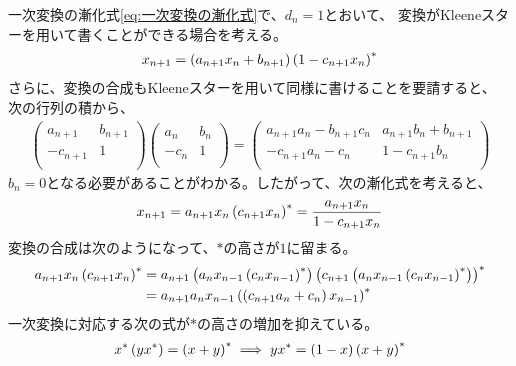 {	一次変換の漸化式\eqref{eq:一次変換の漸化式}で、$d_n=1$とおいて、
	変換がKleeneスターを用いて書くことができる場合を考える。
	\begin{equation*}\begin{split}
		x_{n+1} = \mathinner{\left({a_{n+1}x_n + b_{n+1}}\right)}\mathinner{\left({1 - c_{n+1}x_n}\right)}^*
	\end{split}\end{equation*}
	さらに、変換の合成もKleeneスターを用いて同様に書けることを要請すると、
	次の行列の積から、
	\begin{equation*}\begin{split}
		\begin{pmatrix}
			a_{n+1} & b_{n+1} \\ -c_{n+1} & 1 \\
		\end{pmatrix}\begin{pmatrix}
			a_n & b_n \\ -c_n & 1 \\
		\end{pmatrix} = \begin{pmatrix}
			a_{n+1}a_n - b_{n+1}c_n & a_{n+1}b_n + b_{n+1} \\ 
			-c_{n+1}a_n - c_n & 1 - c_{n+1}b_n \\
		\end{pmatrix}
	\end{split}\end{equation*}
	$b_n=0$となる必要があることがわかる。したがって、次の漸化式を考えると、
	\begin{equation*}\begin{split}
		x_{n+1} = a_{n+1}x_n\mathinner{\left({c_{n+1}x_n}\right)}^*
		= \frac{a_{n+1}x_n}{1 - c_{n+1}x_n}
	\end{split}\end{equation*}
	変換の合成は次のようになって、$*$の高さが$1$に留まる。
	\begin{equation*}\begin{split}
		a_{n+1}x_n\mathinner{\left({c_{n+1}x_n}\right)}^* 
		&= a_{n+1}\mathinner{\left({a_nx_{n-1}\mathinner{\left({c_nx_{n-1}}\right)}^*}\right)}
			\mathinner{\left({c_{n+1}\mathinner{\left({a_nx_{n-1}\mathinner{\left({c_nx_{n-1}}\right)}^*}\right)}}\right)}^* \\
		&= a_{n+1}a_nx_{n-1}\mathinner{\left({\mathinner{\left({c_{n+1}a_n + c_n}\right)}x_{n-1}}\right)}^*
	\end{split}\end{equation*}
	一次変換に対応する次の式が$*$の高さの増加を抑えている。
	\begin{equation*}\begin{split}
		x^*\mathinner{\left({yx^*}\right)} = \mathinner{\left({x + y}\right)}^* \implies yx^* = \mathinner{\left({1 - x}\right)}\mathinner{\left({x + y}\right)}^*
	\end{split}\end{equation*}

}
